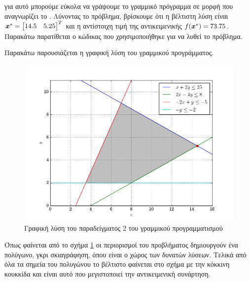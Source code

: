 για αυτό μπορούμε εύκολα να γράψουμε το γραμμικό πρόγραμμα σε μορφή που
αναγνωρίζει το . Λύνοντας το πρόβλημα, βρίσκουμε ότι η βέλτιστη λύση
είναι $\bm{x}^* = \begin{bmatrix} 14.5 & 5.25 \end{bmatrix}^T$ και η αντίστοιχη τιμή
της αντικειμενικής $f(\bm{x}^*) = 73.75$. Παρακάτω παρατίθεται ο κώδικας που
χρησιμοποιήθηκε για να λυθεί το πρόβλημα.
\begin{otherlanguage}{english}

\end{otherlanguage}
Παρακάτω παρουσιάζεται η γραφική λύση του γραμμικού προγράμματος.
\begin{figure}[h]
    \centering
    \includegraphics[width=\textwidth]{figures/lp2.png}
    \caption{Γραφική λύση του παραδείγματος 2
    του γραμμικού προγραμματισμού}\label{fig:lp2}
\end{figure}
Όπως φαίνεται από το σχήμα \ref{fig:lp2} οι περιορισμοί του προβλήματος δημιουργούν
ένα πολύγωνο, γκρι σκιαγράφηση, όπου είναι ο χώρος των δυνατών λύσεων. Τελικά από όλα
τα σημεία του πολυγώνου το βέλτιστο φαίνεται στο σχήμα με την κόκκινη κουκκίδα και είναι
αυτό που μεγιστοποιεί την αντικειμενική συνάρτηση.

